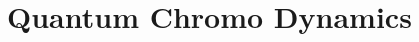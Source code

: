 \documentclass[12pt,a4paper]{article}
\begin{document}
\section*{Quantum Chromo Dynamics}

\end{document}
